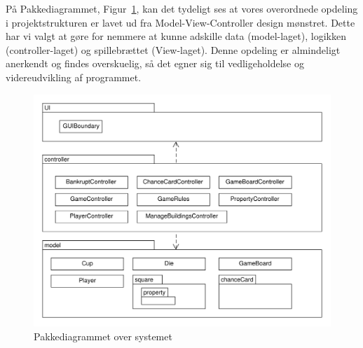 \documentclass[class=article, crop=false]{standalone}
\begin{document}
    På Pakkediagrammet, Figur~\ref{fig:pakkediagram}, kan det tydeligt ses at vores overordnede opdeling i projektstrukturen er lavet ud fra Model-View-Controller design mønstret. Dette har vi valgt at gøre for nemmere at kunne adskille data (model-laget), logikken (controller-laget) og spillebrættet (View-laget). Denne opdeling er almindeligt anerkendt og findes overskuelig, så det egner sig til vedligeholdelse og videreudvikling af programmet.

    \begin{figure}[H]

         \includegraphics[scale=0.7]{diagrams/pakke_diagram.pdf}

        \caption{Pakkediagrammet over systemet}\label{fig:pakkediagram}
    \end{figure}
\end{document}
